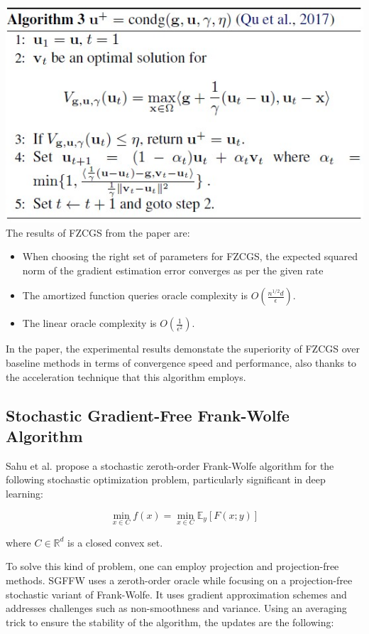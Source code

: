 \documentclass[10pt,twocolumn,letterpaper]{article}
\begin{document}
\includegraphics*[scale=0.7]{img/condg_pseudocode.jpg} \\


The results of FZCGS from the paper are:

\begin{itemize}
   \item When choosing the right set of parameters for FZCGS, the expected squared norm of the gradient estimation error converges as per the given rate
   \item The amortized function queries oracle complexity is $O\left(\frac{n^{1 / 2} d}{\epsilon}\right)$.
   \item The linear oracle complexity is $O\left(\frac{1}{\epsilon^{2}}\right)$.
\end{itemize}

In the paper, the experimental results demonstate the superiority of FZCGS over baseline methods
in terms of convergence speed and performance, also thanks to the acceleration technique that this algorithm employs.

\subsection{Stochastic Gradient-Free Frank-Wolfe Algorithm}

Sahu et al. propose a stochastic zeroth-order Frank-Wolfe algorithm for the following stochastic
optimization problem, particularly significant in deep learning:

\[
\min _{x \in C} f(x)=\min _{x \in C} \mathbb{E}_{y}[F(x ; y)]
\]

where $C \in \mathbb{R}^{d}$ is a closed convex set.

To solve this kind of problem, one can employ projection and projection-free methods.
SGFFW uses a zeroth-order oracle while focusing on a projection-free stochastic variant
of Frank-Wolfe. It uses gradient approximation schemes and addresses challenges such as non-smoothness
and variance. Using an averaging trick to ensure the stability of the algorithm,
the updates are the following:
\end{document}
